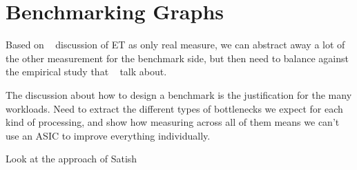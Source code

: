 \section{Benchmarking Graphs}
\label{section:14-Benchmarking-Graphs}


Based on ~\cite{Hennessy2019} discussion of ET as only real measure, we can abstract away a lot of the other measurement for the benchmark side, but then need to balance against the empirical study that ~\cite{Hooker1994,Hooker1995} talk about. 

The \cite{Hennessy2019} discussion about how to design a benchmark is the justification for the many workloads. Need to extract the different types of bottlenecks we expect for each kind of processing, and show how measuring across all of them means we can't use an ASIC to improve everything individually. 

Look at the approach of Satish~\cite{Satish2014}
